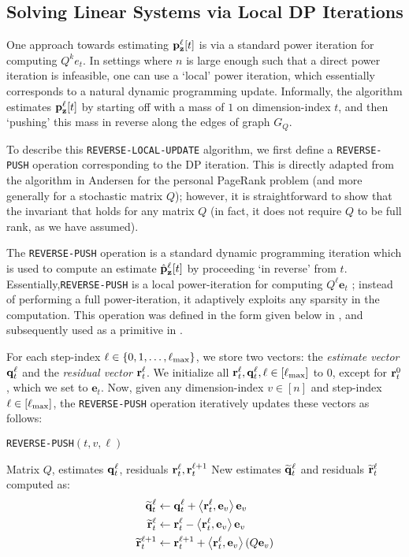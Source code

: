 \subsection{Solving Linear Systems via Local DP Iterations}
\label{ssec:reverse}

One approach towards estimating ${\mathbf{p}}_\mathbf{z}^{\ell}[t]$ is via a standard power iteration for computing $Q^ke_t$. 
In settings where $n$ is large enough such that a direct power iteration is infeasible, one can use a `local' power iteration, which essentially corresponds to a natural dynamic programming update. Informally, the algorithm estimates ${\mathbf{p}}_\mathbf{z}^{\ell}[t]$ by starting off with a mass of $1$ on dimension-index $t$, and then `pushing' this mass in reverse along the edges of graph $G_Q$. 

To describe this \texttt{REVERSE-LOCAL-UPDATE} algorithm, we first define a \texttt{REVERSE-PUSH} operation corresponding to the DP iteration. 
This is directly adapted from the algorithm in Andersen \cite{andersen2007local} for the personal PageRank problem (and more generally for a stochastic matrix $Q$); however, it is straightforward to show that the invariant that holds for any matrix $Q$ (in fact, it does not require $Q$ to be full rank, as we have assumed).
 
The \texttt{REVERSE-PUSH} operation is a standard dynamic programming iteration which is used to compute an estimate $\hat{\mathbf{p}}_\mathbf{z}^{\ell}[t]$ by proceeding `in reverse' from $t$. 
Essentially,\texttt{REVERSE-PUSH} is a local power-iteration for computing $Q^{\ell}\mathbf{e}_t$ ; instead of performing a full power-iteration, it adaptively exploits any sparsity in the computation.
This operation was defined in the form given below in \cite{andersen2007local}, and subsequently used as a primitive in \cite{banerjee2015fast, lee2014asynchronous}.


For each step-index $\ell\in\{0,1,\ldots,\ell_{\max}\}$, we store two vectors: the \emph{estimate vector} $\mathbf{q}^{\ell}_t$ and the \emph{residual vector} $\mathbf{r}^{\ell}_t$.
We initialize all $\mathbf{r}^{\ell}_t,\mathbf{q}^{\ell}_t, \ell\in[\ell_{\max}]$ to $0$, except for $\mathbf{r}^{0}_t$, which we set to $\mathbf{e}_t$.
Now, given any dimension-index $v\in[n]$ and step-index $\ell\in[\ell_{\max}]$, the \texttt{REVERSE-PUSH} operation iteratively updates these vectors as follows:
\begin{algorithm}[!ht]
\caption{\texttt{REVERSE-PUSH}$(t,v,\ell)$}
\label{alg:push}
\begin{algorithmic}[1]
\REQUIRE Matrix $Q$, estimates $\mathbf{q}^{\ell}_t$, residuals $\mathbf{r}^{\ell}_t,\mathbf{r}^{\ell+1}_t$
\RETURN New estimates $\widetilde{\mathbf{q}}^{\ell}_t$ and residuals $\widetilde{\mathbf{r}}^{\ell}_t$ computed as:
\begin{align*}
	\widetilde{\mathbf{q}}^{\ell}_t &\leftarrow \mathbf{q}^{\ell}_t + \left< \mathbf{r}^{\ell}_t, \mathbf{e}_v \right>\mathbf{e}_v \\
	\widetilde{\mathbf{r}}^{\ell}_t &\leftarrow \mathbf{r}^{\ell}_t - \left< \mathbf{r}^{\ell}_t, \mathbf{e}_v \right>\mathbf{e}_v \\
	\widetilde{\mathbf{r}}^{\ell+1}_t &\leftarrow \mathbf{r}^{\ell+1}_t + \left< \mathbf{r}^{\ell}_t, \mathbf{e}_v \right>(Q\mathbf{e}_v)
\end{align*}	
\end{algorithmic}
\end{algorithm}    

